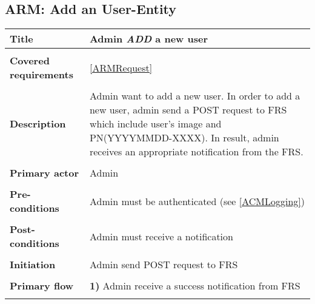 \documentclass[a4paper,11pt]{article}
\begin{document}
\subsection{ARM: Add an User-Entity}

\begin{tabular}{|p{3.5cm}|p{11.5cm}|} \hline
    \textbf{Title} &   Admin \emph{ADD} a new user

    \\ \hline \rowcolor{Gray} & \\ \hline

    \textbf{Covered requirements} &  \ref{ARMRequest}

    \\ \hline \rowcolor{Gray} & \\ \hline

    \textbf{Description} &  Admin want to add a new user. In order to add a new user, admin send a POST request to FRS which include user's image and PN(YYYYMMDD-XXXX). In result, admin receives an appropriate notification from the FRS.

    \\ \hline \rowcolor{Gray} & \\ \hline

    \textbf{Primary actor} & Admin

    \\ \hline \rowcolor{Gray} & \\ \hline

    \textbf{Pre-conditions} &   Admin must be authenticated (see \ref{ACMLogging})

    \\ \hline \rowcolor{Gray} & \\ \hline

    \textbf{Post-conditions} &   Admin must receive a notification

    \\ \hline \rowcolor{Gray} & \\ \hline

    \textbf{Initiation} & Admin send POST request to FRS

    \\ \hline \rowcolor{Gray} & \\ \hline

    \textbf{Primary flow} &
    \textbf{1)} Admin receive a success notification from FRS

    \\ \hline \rowcolor{Gray} & \\ \hline


\end{tabular}
\end{document}
